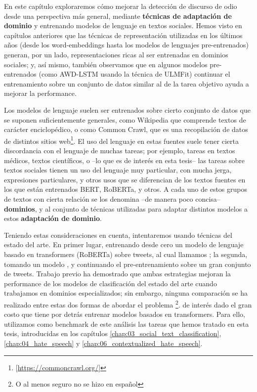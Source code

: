 
\newcommand{\deacc}[0]{\textbf{deacc}}
\newcommand{\cased}[0]{\textbf{cased}}
\newcommand{\uncased}[0]{\textbf{uncased}}

En este capítulo exploraremos cómo mejorar la detección de discurso de odio desde una perspectiva más general, mediante \textbf{técnicas de adaptación de dominio} y entrenando modelos de lenguaje en textos sociales. Hemos visto en capítulos anteriores que las técnicas de representación utilizadas en los últimos años (desde los word-embeddings hasta los modelos de lenguajes pre-entrenados) generan, por un lado, representaciones ricas al ser entrenadas en dominios sociales; y, así mismo, también observamos que en algunos modelos pre-entrenados (como AWD-LSTM usando la técnica de ULMFit)  continuar el entrenamiento sobre un conjunto de datos similar al de la tarea objetivo ayuda a mejorar la performance.

Los modelos de lenguaje suelen ser entrenados sobre cierto conjunto de datos que se suponen suficientemente generales, como Wikipedia que comprende textos de carácter enciclopédico, o como Common Crawl, que es una recopilación de datos de distintos sitios web\footnote{[\url{https://commoncrawl.org/}]}. El uso del lenguaje en estas fuentes suele tener cierta discordancia con el lenguaje de muchas tareas; por ejemplo, tareas en textos médicos, textos científicos, o --lo que es de interés en esta tesis-- las tareas sobre textos sociales tienen un uso del lenguaje muy particular, con mucha jerga, expresiones particulares, y otros usos que se diferencian de los textos fuentes en los que están entrenados BERT, RoBERTa, \beto{} y otros. A cada uno de estos grupos de textos con cierta relación se los denomina --de manera poco concisa-- \textbf{dominios}, y al conjunto de técnicas utilizadas para adaptar distintos modelos a estos \textbf{adaptación de dominio}.

Teniendo estas consideraciones en cuenta, intentaremos  usando técnicas del estado del arte. En primer lugar, entrenando desde cero un modelo de lenguaje basado en transformers (RoBERTa)\cite{liu2019roberta} sobre tweets, al cual llamamos \robertuito{}; la segunda, tomando un modelo \beto{}, y continuando el pre-entrenamiento sobre un gran conjunto de tweets. Trabajo previo ha demostrado que ambas estrategias mejoran la performance de los modelos de clasificación del estado del arte cuando trabajamos en dominios especializados; sin embargo, ninguna comparación se ha realizado entre estas dos formas de abordar el problema \footnote{O al menos seguro no se hizo en español}. de interés dado el gran costo que tiene por detrás entrenar modelos basados en transformers. Para ello, utilizamos como benchmark de este análisis las tareas que hemos tratado en esta tesis, introducidas en los capítulos \ref{chap:03_social_text_classification}, \ref{chap:04_hate_speech} y \ref{chap:06_contextualized_hate_speech}.

